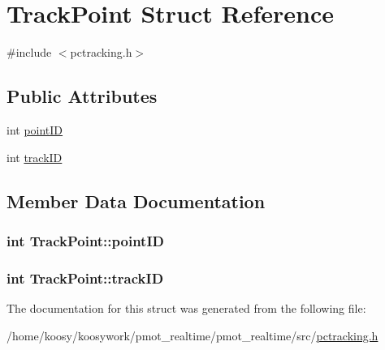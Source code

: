 \hypertarget{struct_track_point}{\section{\-Track\-Point \-Struct \-Reference}
\label{struct_track_point}
}


{\ttfamily \#include $<$pctracking.\-h$>$}

\subsection*{\-Public \-Attributes}
\begin{DoxyCompactItemize}
\item 
int \hyperlink{struct_track_point_a3dc2f6c4182b53721097087afac688bd}{point\-I\-D}
\item 
int \hyperlink{struct_track_point_addda993c1087d9dde1f04f55b6376931}{track\-I\-D}
\end{DoxyCompactItemize}


\subsection{\-Member \-Data \-Documentation}
\hypertarget{struct_track_point_a3dc2f6c4182b53721097087afac688bd}{
\subsubsection[{point\-I\-D}]{\setlength{\rightskip}{0pt plus 5cm}int {\bf \-Track\-Point\-::point\-I\-D}}}\label{struct_track_point_a3dc2f6c4182b53721097087afac688bd}
\hypertarget{struct_track_point_addda993c1087d9dde1f04f55b6376931}{
\subsubsection[{track\-I\-D}]{\setlength{\rightskip}{0pt plus 5cm}int {\bf \-Track\-Point\-::track\-I\-D}}}\label{struct_track_point_addda993c1087d9dde1f04f55b6376931}


\-The documentation for this struct was generated from the following file\-:\begin{DoxyCompactItemize}
\item 
/home/koosy/koosywork/pmot\-\_\-realtime/pmot\-\_\-realtime/src/\hyperlink{pctracking_8h}{pctracking.\-h}\end{DoxyCompactItemize}
